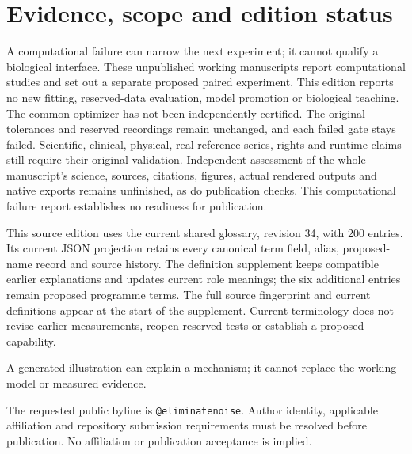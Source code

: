 \section*{Evidence, scope and edition status}
A computational failure can narrow the next experiment; it cannot qualify a
biological interface. These unpublished working manuscripts report computational
studies and set out a separate proposed paired experiment. This edition reports
no new fitting, reserved-data evaluation, model promotion or biological teaching.
The common optimizer has not been independently certified. The original
tolerances and reserved recordings remain unchanged, and each failed gate stays
failed. Scientific, clinical, physical, real-reference-series, rights and runtime
claims still require their original validation. Independent assessment of the
whole manuscript's science, sources, citations, figures, actual rendered outputs
and native exports remains unfinished, as do publication checks. This
computational failure report establishes no readiness for publication.

This source edition uses the current shared glossary, revision 34, with 200 entries.
Its current JSON projection retains every canonical term field, alias, proposed-name record and source history.
The definition supplement keeps compatible earlier explanations and updates current role meanings; the six additional entries remain proposed programme terms.
The full source fingerprint and current definitions appear at the start of the supplement.
Current terminology does not revise earlier measurements, reopen reserved tests or establish a proposed capability.

A generated illustration can explain a mechanism; it cannot replace
the working model or measured evidence.

The requested public byline is \texttt{@eliminatenoise}. Author identity,
applicable affiliation and repository submission requirements must be resolved
before publication. No affiliation or publication acceptance is implied.
